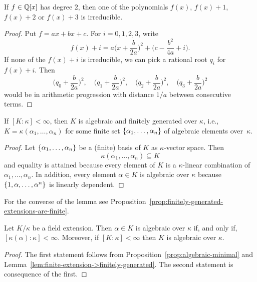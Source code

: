 \begin{cor}
    If $f\in\mathbb{Q}[x]$ has degree $2$, then one of the polynomials $f(x)$, $f(x)+1$, $f(x)+2$ or $f(x)+3$ is irreducible.
\end{cor}

\begin{proof}
    Put $f=ax+bx+c$. For $i=0,1,2,3$, write
    $$
        f(x)+i = a\Big(x+\frac b{2a}\Big)^2+\Big(c-\frac{b^2}{4a}+i\Big).
    $$
    If none of the $f(x)+i$ is irreducible, we can pick a rational root $q_i$ for $f(x)+i$. Then
    $$
        \Big(q_0+\frac b{2a}\Big)^2
            ,\quad\Big(q_1+\frac b{2a}\Big)^2
            ,\quad\Big(q_2+\frac b{2a}\Big)^2
            ,\quad\Big(q_3+\frac b{2a}\Big)^2
    $$
    would be in arithmetic progression with distance $1/a$ between consecutive terms.
    
\end{proof}


\begin{lem}\label{lem:finite-extension->finitely-generated}
    If\/ $[K:\kappa]<\infty$, then\/ $K$ is algebraic and finitely generated over\/ $\kappa$, i.e., $K=\kappa(\alpha_1,\dots,\alpha_n)$ for some finite set\/ $\{\alpha_1,\dots,\alpha_n\}$ of algebraic elements over\/~$\kappa$.
\end{lem}

\begin{proof}
    Let $\{\alpha_1,\dots,\alpha_n\}$ be a (finite) basis of $K$ as $\kappa$-vector space. Then
    $$
        \kappa(\alpha_1,\dots,\alpha_n)\subseteq K
    $$
    and equality is attained because every element of $K$ is a $\kappa$-linear combination of $\alpha_1,\dots,\alpha_n$. In addition, every element $\alpha\in K$ is algebraic over $\kappa$ because $\{1,\alpha,\dots,\alpha^n\}$ is linearly dependent.
\end{proof}

\begin{rem}
    For the converse of the lemma see Proposition~\ref{prop:finitely-generated-extensions-are-finite}.
\end{rem}

\begin{prop}\label{prop:algebraic-iff-finite}
    Let\/ $K/\kappa$ be a field extension. Then\/ $\alpha\in K$ is algebraic over\/ $\kappa$ if, and only if, $[\kappa(\alpha):\kappa]<\infty$. Moreover, if\/ $[K:\kappa] < \infty$ then $K$ is algebraic over\/ $\kappa$.
\end{prop}

\begin{proof}
    The first statement follows from Proposition~\ref{prop:algebraic-minimal} and Lemma~\ref{lem:finite-extension->finitely-generated}. The second statement is consequence of the first.
\end{proof}

